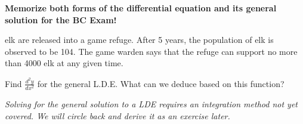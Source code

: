 \vspace{.25in}


\begin{center}
    \textbf{\large Memorize both forms of the differential equation and its general solution for the BC Exam!}
\end{center}


\newpage



\begin{questions}
    \setcounter{question}{1}
     elk are released into a game refuge. After 5 years, the population of elk is observed to be 104. The game warden says that the refuge can support no more than 4000 elk at any given time.
    
    \question Find $\displaystyle\frac{d^2 y}{dx^2}$ for the general L.D.E. What can we deduce based on this function?
\end{questions}


\textit{\footnotesize Solving for the general solution to a LDE requires an integration method not yet covered. We will circle back and derive it as an exercise later.}


\newpage
